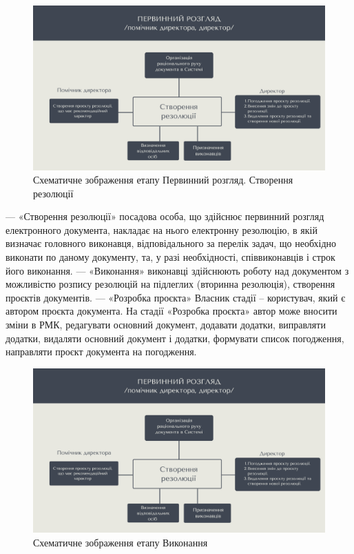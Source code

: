 \begin{figure}[!htbp]
\centerline{\includegraphics[width=\textwidth]{img/4.4.2.png}}
\caption{Схематичне зображення етапу Первинний розгляд. Створення резолюції}
\end{figure}

--- «Створення резолюції» посадова особа, що здійснює первинний розгляд
електронного документа, накладає на нього електронну резолюцію, в якій
визначає головного виконавця, відповідального за перелік задач, що
необхідно виконати по даному документу, та, у разі необхідності,
співвиконавців і строк його виконання.
--- «Виконання» виконавці здійснюють роботу над документом з можливістю
розпису резолюцій на підлеглих (вторинна резолюція), створення проєктів
документів.
--- «Розробка проєкта» Власник стадії – користувач, який є автором проєкта
документа. На стадії «Розробка проєкта» автор може вносити зміни в РМК,
редагувати основний документ, додавати додатки, виправляти додатки,
видаляти основний документ і додатки, формувати список погодження,
направляти проєкт документа на погодження.

\begin{figure}[!htbp]
\centerline{\includegraphics[width=\textwidth]{img/4.4.2.png}}
\caption{Схематичне зображення етапу Виконання}
\end{figure}


